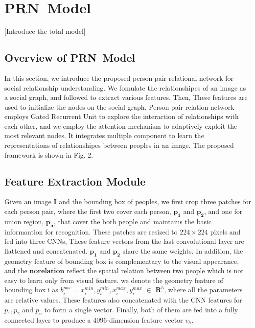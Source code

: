 \documentclass{article}
\newcommand{\PRN}{{\sf PRN}}
\begin{document}
\section{\PRN \ Model}

[Introduce the total model]

\subsection{Overview of  \PRN \ Model} \label{section:ov}
In this section, we introduce the proposed person-pair relational network for social relationship understanding. We fomulate the relationshipes of an image as a social graph, and followed\cite{DBLP:conf/ijcai/WangCRYCL18}
to extract various features. Then, These features are used to initialize the nodes on the social graph. Person pair relation network employs Gated Recurrent Unit\cite{DBLP:conf/ssst/ChoMBB14} to explore the interaction of relationships with each other, and we employ the attention mechanism to adaptively exploit the most relevant nodes. It integrates multiple
component to learn the representations of relationshipes between peoples in an image. 
 The proposed framework is shown in Fig. 2.

\subsection{Feature Extraction Module} \label{section:vs}

Given an image \textbf{I} and the bounding box of peoples, we first crop three patches for each person pair, where the first two cover each person, $\mathbf{p_1}$ and $\mathbf{p_2}$, and one for union region, $\mathbf{p_u}$, that cover the both people and maintains the basic informantion for recognition. These patches are resized to $224\times224$ pixels and fed into three CNNs, These feature vectors from the last convolutional layer are flattened and concatenated. $\mathbf{p_1}$ and $\mathbf{p_2}$ share the same weights. In addition, the geometry feature of bounding box is complementary to the visual appearance, and the $\mathbf{no relation}$ reflect the spatial relation between two people which is not easy to learn only from visual feature. we denote the geometry feature of bounding box i as $b_i^{pos}$ = ${x_i^{min}, y_i^{min},x_i^{max},y_i^{max}}$  $\in$ $\mathbf{R}^5$, where all the parameters are relative values. These features also concatenated with the CNN features for $p_1,p_2$ and $p_u$ to form a single vector. Finally, both of them are fed into a fully connected layer to produce a 4096-dimension feature vector $v_h$. 
\end{document}
